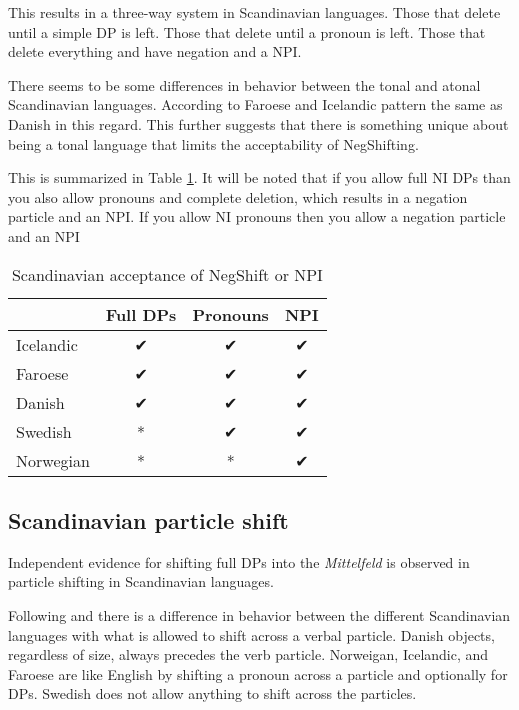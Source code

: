 \documentclass[12pt, letterpaper]{article}
\begin{document}
\ex This results in a three-way system in Scandinavian languages. 
	\ea Those that delete until a simple DP is left.
	\ex Those that delete until a pronoun is left.
	\ex Those that delete everything and have negation and a NPI.
	\z 

\ex There seems to be some differences in behavior between the tonal and atonal Scandinavian languages. 
	\ea According to \citet{thrainssonFaroeseOverviewReference2004,thrainssonSyntaxIcelandic2010} Faroese and Icelandic pattern the same as Danish in this regard. 
	\ex This further suggests that there is something unique about being a tonal language that limits the acceptability of NegShifting. 
	\z 

\ex This is summarized in Table \ref{tab:Paradigm}.
	\ea It will be noted that if you allow full NI DPs than you also allow pronouns and complete deletion, which results in a negation particle and an NPI.
	\ex If you allow NI pronouns then you allow a negation particle and an NPI
	\z 
\begin{table}[!ht]
	\centering
	\caption{Scandinavian acceptance of NegShift or NPI}
	\label{tab:Paradigm}
\begin{tabular}{lccc}
	\hline 
	& Full DPs & Pronouns & NPI\\
	\hline
	Icelandic & ✔︎ & ✔︎ & ✔︎ \\
	Faroese & ✔︎ & ✔︎ & ✔︎ \\
	Danish & ✔︎ & ✔︎ & ✔︎ \\
	Swedish & * & ✔︎ & ✔︎ \\
	Norwegian & * & * & ✔︎ \\
	\hline 
\end{tabular} 
\end{table}
\z 
\subsection{Scandinavian particle shift} \label{sec:Particles}
\ea Independent evidence for shifting full DPs into the \emph{Mittelfeld} is observed in particle shifting in Scandinavian languages. 

\ex Following \citet[2]{holmbergRemarksHolmbergGeneralization1999} and \citet{faarlundSyntaxMainlandScandinavian2019} there is a difference in behavior between the different Scandinavian languages with what is allowed to shift across a verbal particle.
	\ea Danish objects, regardless of size, always precedes the verb particle. 
	\ex Norweigan, Icelandic, and Faroese are like English by shifting a pronoun across a particle and optionally for DPs.
	\ex Swedish does not allow anything to shift across the particles. 
	\z 
\end{document}
